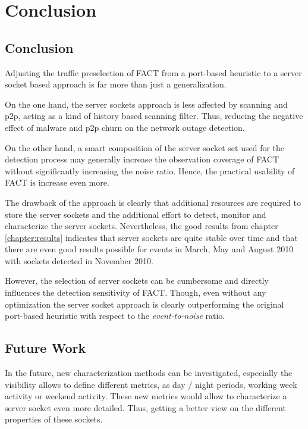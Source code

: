 \chapter{Conclusion\label{Conclusion}}

\section{Conclusion}
Adjusting the traffic preselection of FACT from a port-based heuristic to a 
server socket based approach is far more than just a generalization. 

On the one hand, the server sockets approach is less affected by scanning and 
p2p, acting as a kind of history based scanning filter. Thus, reducing the 
negative effect of malware and p2p churn on the network outage detection. 

On the other hand, a smart composition of the server socket set used for the 
detection process may generally increase the observation coverage of FACT 
without significantly increasing the noise ratio. Hence, the practical usability 
of FACT is increase even more.

The drawback of the approach is clearly that additional resources are required 
to store the server sockets and the additional effort to detect, monitor and 
characterize the server sockets. 
Nevertheless, the good results from chapter \ref{chapter:results} indicates that 
server sockets are quite stable over time and that there are even good results 
possible for events in March, May and August 2010 with sockets detected in 
November 2010. 

However, the selection of server sockets can be cumbersome and directly 
influences the detection sensitivity of FACT. Though, even without any 
optimization the server socket approach is clearly outperforming the original port-based heuristic with respect to the \emph{event-to-noise} ratio. 

\section{Future Work}

In the future, new characterization methods can be investigated, especially the 
visibility allows to define different metrics, as day / night periods, working 
week activity or weekend activity. These new metrics would allow to characterize 
a server socket even more detailed. Thus, getting a better view on the different 
properties of these sockets. 

